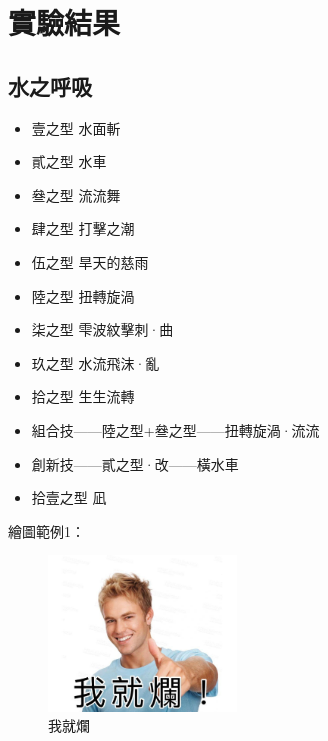 \chapter{實驗結果}\label{result}

\section{水之呼吸}
\begin{itemize}
\item 壹之型 水面斬
\item 貳之型 水車
\item 叄之型 流流舞
\item 肆之型 打擊之潮
\item 伍之型 旱天的慈雨
\item 陸之型 扭轉旋渦
\item 柒之型 雫波紋擊刺·曲
\item 玖之型 水流飛沫·亂
\item 拾之型 生生流轉
\item 組合技——陸之型+叄之型——扭轉旋渦·流流
\item 創新技——貳之型·改——橫水車
\item 拾壹之型 凪
\end{itemize}

繪圖範例1：
\begin{figure}[H]

   \centering
        \includegraphics[width=5cm]{../Figures/Result/我就爛}
   \caption{我就爛}
   \label{fig:我就爛}

\end{figure}

